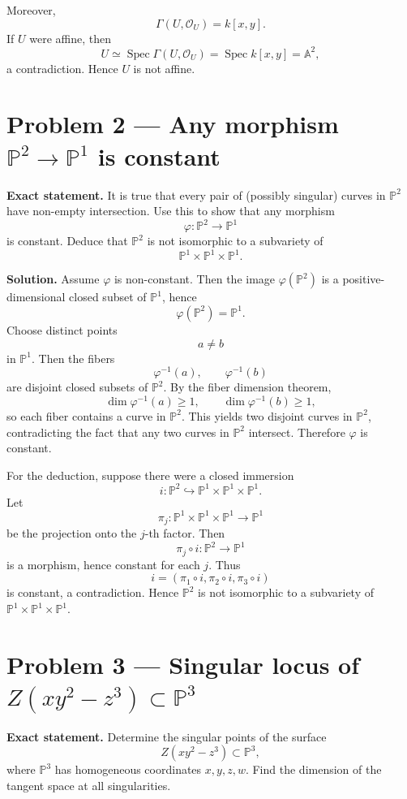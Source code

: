 \documentclass[12pt,a4paper]{article}
\theoremstyle{plain}
\theoremstyle{definition}      %
\begin{document}
Moreover,
\[
\Gamma(U,\mathcal O_U)=k[x,y].
\]
If \(U\) were affine, then
\[
U\simeq \operatorname{Spec}\Gamma(U,\mathcal O_U)=\operatorname{Spec}k[x,y]=\mathbb A^2,
\]
a contradiction.
Hence \(U\) is not affine.


\section*{Problem 2 — Any morphism \(\mathbb P^2\to \mathbb P^1\) is constant}

\textbf{Exact statement.}
It is true that every pair of (possibly singular) curves in \(\mathbb P^2\) have non-empty intersection.
Use this to show that any morphism
\[
\varphi:\mathbb P^2\to \mathbb P^1
\]
is constant.
Deduce that \(\mathbb P^2\) is not isomorphic to a subvariety of
\[
\mathbb P^1\times \mathbb P^1\times \mathbb P^1.
\]

\textbf{Solution.}
Assume \(\varphi\) is non-constant.
Then the image \(\varphi(\mathbb P^2)\) is a positive-dimensional closed subset of \(\mathbb P^1\), hence
\[
\varphi(\mathbb P^2)=\mathbb P^1.
\]
Choose distinct points
\[
a\neq b
\]
in \(\mathbb P^1\).
Then the fibers
\[
\varphi^{-1}(a),
\qquad
\varphi^{-1}(b)
\]
are disjoint closed subsets of \(\mathbb P^2\).
By the fiber dimension theorem,
\[
\dim \varphi^{-1}(a)\ge 1,
\qquad
\dim \varphi^{-1}(b)\ge 1,
\]
so each fiber contains a curve in \(\mathbb P^2\).
This yields two disjoint curves in \(\mathbb P^2\), contradicting the fact that any two curves in \(\mathbb P^2\) intersect.
Therefore \(\varphi\) is constant.

For the deduction, suppose there were a closed immersion
\[
i:\mathbb P^2\hookrightarrow \mathbb P^1\times \mathbb P^1\times \mathbb P^1.
\]
Let
\[
\pi_j:\mathbb P^1\times \mathbb P^1\times \mathbb P^1\to \mathbb P^1
\]
be the projection onto the \(j\)-th factor.
Then
\[
\pi_j\circ i:\mathbb P^2\to \mathbb P^1
\]
is a morphism, hence constant for each \(j\).
Thus
\[
i=(\pi_1\circ i,\pi_2\circ i,\pi_3\circ i)
\]
is constant, a contradiction.
Hence \(\mathbb P^2\) is not isomorphic to a subvariety of \(\mathbb P^1\times \mathbb P^1\times \mathbb P^1\).


\section*{Problem 3 — Singular locus of \(Z(xy^2-z^3)\subset \mathbb P^3\)}

\textbf{Exact statement.}
Determine the singular points of the surface
\[
Z(xy^2-z^3)\subset \mathbb P^3,
\]
where \(\mathbb P^3\) has homogeneous coordinates \(x,y,z,w\).
Find the dimension of the tangent space at all singularities.
\end{document}
